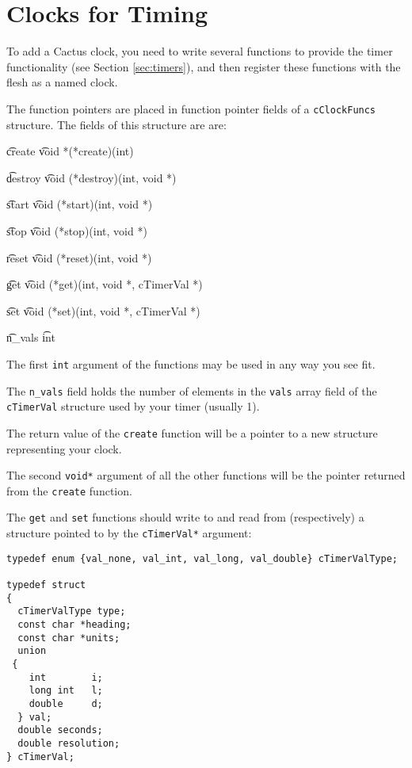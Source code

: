 \section{Clocks for Timing}
\label{chap:clocks}

To add a Cactus clock, you need to write several functions to provide the
timer functionality (see Section \ref{sec:timers}), and then register these
functions with the flesh as a named clock.

The function pointers are placed in function pointer fields of a 
\texttt{cClockFuncs} structure.  The fields of this structure are are:

\begin{Lentry}

\item[{\t create}] {\t void *(*create)(int)}
\item[{\t destroy}] {\t void (*destroy)(int, void *)}
\item[{\t start}] {\t void (*start)(int, void *)}
\item[{\t stop}] {\t void (*stop)(int, void *)}
\item[{\t reset}] {\t void (*reset)(int, void *)}
\item[{\t get}] {\t void (*get)(int, void *, cTimerVal *)}
\item[{\t set}] {\t void (*set)(int, void *, cTimerVal *)}
\item[{\t n\_vals}] {\t int}

\end{Lentry}

The first \texttt{int} argument of the functions may be used in any way
you see fit.

The \texttt{n\_vals} field holds the number of elements in the 
\texttt{vals} array field of the \texttt{cTimerVal} structure 
used by your timer (usually 1).

The return value of the \texttt{create} function will be a pointer to
a new structure representing your clock.

The second \texttt{void*} argument of all the other functions will be the
pointer returned from the \texttt{create} function.

The \texttt{get} and \texttt{set} functions should write to and read from
(respectively) a structure pointed to by the \texttt{cTimerVal*} argument:

\begin{verbatim}
typedef enum {val_none, val_int, val_long, val_double} cTimerValType;

typedef struct
{
  cTimerValType type;
  const char *heading;
  const char *units;
  union
 {
    int        i;
    long int   l;
    double     d;
  } val;
  double seconds;
  double resolution;
} cTimerVal;
\end{verbatim}

